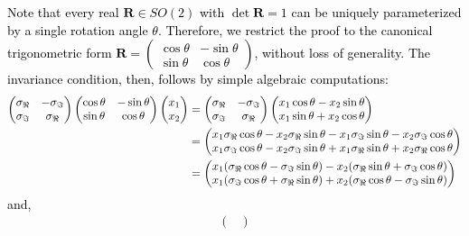 \documentclass[aps,showpacs,preprintnumbers,amsmath,amssymb,twocolumn,superscriptaddress,floatfix,nofootinbib,10pt,pre]{revtex4-1}
\begin{document}
\textcolor{black}{
Note that every real $\mathbf R\in SO(2)$ with $\det\mathbf R=1$ can be uniquely parameterized by a single rotation angle $\theta$. Therefore, we restrict the proof to the canonical trigonometric form $\mathbf R=\begin{pmatrix}
    \cos\theta & -\sin\theta \\
    \sin\theta & \cos\theta
\end{pmatrix}$, without loss of generality. 
The invariance condition, then, follows by simple algebraic computations:
\begin{align}
\begin{pmatrix}
    \sigma_{\Re} & -\sigma_{\Im} \\
    \sigma_{\Im} & \sigma_{\Re}
\end{pmatrix}
\begin{pmatrix}
    \cos\theta & -\sin\theta \\
    \sin\theta & \cos\theta
\end{pmatrix}\begin{pmatrix}
    x_1 \\ x_2
\end{pmatrix} &= \begin{pmatrix}
    \sigma_{\Re} & -\sigma_{\Im} \\
    \sigma_{\Im} & \sigma_{\Re}
\end{pmatrix}
\begin{pmatrix}
    x_1\cos\theta-x_2\sin\theta \\
    x_1\sin\theta+x_2\cos\theta
\end{pmatrix} \notag\\
&=
\begin{pmatrix}
    x_1\sigma_{\Re}\cos\theta-x_2\sigma_{\Re}\sin\theta-x_1\sigma_{\Im}\sin\theta-x_2\sigma_{\Im}\cos\theta \\
    x_1\sigma_{\Im}\cos\theta-x_2\sigma_{\Im}\sin\theta+x_1\sigma_{\Re}\sin\theta+x_2\sigma_{\Re}\cos\theta
\end{pmatrix}\notag\\
&=\begin{pmatrix}
    x_1(\sigma_{\Re}\cos\theta-\sigma_{\Im}\sin\theta)-x_2(\sigma_{\Re}\sin\theta+\sigma_{\Im}\cos\theta) \\   x_1(\sigma_{\Im}\cos\theta+\sigma_{\Re}\sin\theta)+x_2(\sigma_{\Re}\cos\theta-\sigma_{\Im}\sin\theta)
\end{pmatrix}
\end{align}
and,
\begin{align}
\begin{pmatrix}

\end{pmatrix}
\end{align}}
\end{document}
